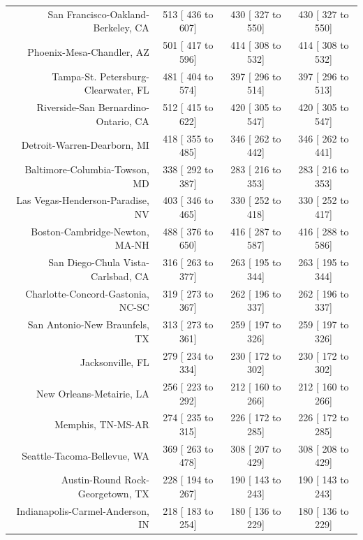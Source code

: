 \documentclass{article}
\begin{document}
\begin{table}[H]
\begin{tabular}{|r|c|c|c|}
		San Francisco-Oakland-Berkeley, CA &    513 [   436 to    607] &    430 [   327 to    550] &    430 [   327 to    550]\\
		Phoenix-Mesa-Chandler, AZ &    501 [   417 to    596] &    414 [   308 to    532] &    414 [   308 to    532]\\
		Tampa-St. Petersburg-Clearwater, FL &    481 [   404 to    574] &    397 [   296 to    514] &    397 [   296 to    513]\\
		Riverside-San Bernardino-Ontario, CA &    512 [   415 to    622] &    420 [   305 to    547] &    420 [   305 to    547]\\
		Detroit-Warren-Dearborn, MI &    418 [   355 to    485] &    346 [   262 to    442] &    346 [   262 to    441]\\
		Baltimore-Columbia-Towson, MD &    338 [   292 to    387] &    283 [   216 to    353] &    283 [   216 to    353]\\
		Las Vegas-Henderson-Paradise, NV &    403 [   346 to    465] &    330 [   252 to    418] &    330 [   252 to    417]\\
		Boston-Cambridge-Newton, MA-NH &    488 [   376 to    650] &    416 [   287 to    587] &    416 [   288 to    586]\\
		San Diego-Chula Vista-Carlsbad, CA &    316 [   263 to    377] &    263 [   195 to    344] &    263 [   195 to    344]\\
		Charlotte-Concord-Gastonia, NC-SC &    319 [   273 to    367] &    262 [   196 to    337] &    262 [   196 to    337]\\
		San Antonio-New Braunfels, TX &    313 [   273 to    361] &    259 [   197 to    326] &    259 [   197 to    326]\\
		Jacksonville, FL &    279 [   234 to    334] &    230 [   172 to    302] &    230 [   172 to    302]\\
		New Orleans-Metairie, LA &    256 [   223 to    292] &    212 [   160 to    266] &    212 [   160 to    266]\\
		Memphis, TN-MS-AR &    274 [   235 to    315] &    226 [   172 to    285] &    226 [   172 to    285]\\
		Seattle-Tacoma-Bellevue, WA &    369 [   263 to    478] &    308 [   207 to    429] &    308 [   208 to    429]\\
		Austin-Round Rock-Georgetown, TX &    228 [   194 to    267] &    190 [   143 to    243] &    190 [   143 to    243]\\
		Indianapolis-Carmel-Anderson, IN &    218 [   183 to    254] &    180 [   136 to    229] &    180 [   136 to    229]\\

\end{tabular}
\end{table}
\end{document}

